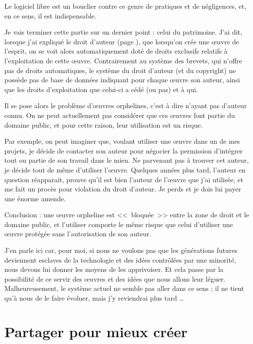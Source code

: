Le logiciel libre est un bouclier contre ce genre de pratiques et de négligences, et, en ce sens, il est indispensable.

Je vais terminer cette partie sur un dernier point : celui du patrimoine.
J'ai dit, lorsque j'ai expliqué le droit d'auteur (page \pageref{droit-auteur}), que lorsqu'on crée une œuvre de l'esprit, on se voit alors automatiquement doté de droits exclusifs relatifs à l'exploitation de cette œuvre.
Contrairement au système des brevets, qui n'offre pas de droits automatiques, le système du droit d'auteur (et du copyright) ne possède pas de base de données indiquant pour chaque œuvre son auteur, ainsi que les droits d'exploitation que celui-ci a cédé (ou pas) et à qui.

\label{oeuvres-orphelines}
Il se pose alors le problème d'œuvres orphelines, c'est à dire n'ayant pas d'auteur connu.
On ne peut actuellement pas considérer que ces œuvres font partie du domaine public, et pour cette raison, leur utilisation est un risque.

Par exemple, on peut imaginer que, voulant utiliser une œuvre dans un de mes projets, je décide de contacter son auteur pour négocier la permission d'intégrer tout ou partie de son travail dans le mien.
Ne parvenant pas à trouver cet auteur, je décide tout de même d'utiliser l'œuvre.
Quelques années plus tard, l'auteur en question réapparait, prouve qu'il est bien l'auteur de l'œuvre que j'ai utilisée, et me fait un procès pour violation du droit d'auteur.
Je perds et je dois lui payer une énorme amende.

Conclusion : une œuvre orpheline est <<~bloquée~>> entre la zone de droit et le domaine public, et l'utiliser comporte le même risque que celui d'utiliser une œuvre protégée sans l'autorisation de son 	auteur.

J'en parle ici car, pour moi, si nous ne voulons pas que les générations futures deviennent esclaves de la technologie et des idées contrôlées par une minorité, nous devons lui donner les moyens de les apprivoiser.
Et cela passe par la possibilité de ce servir des œuvres et des idées que nous allons leur léguer.
Malheureusement, le système actuel ne semble pas aller dans ce sens ; il ne tient qu'à nous de le faire évoluer, mais j'y reviendrai plus tard \dots{}

\section{Partager pour mieux créer}

